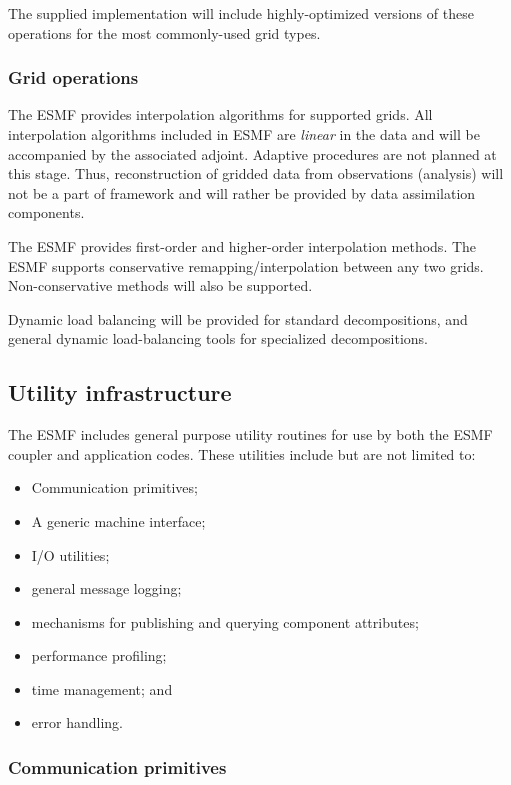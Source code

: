 The supplied implementation will include highly-optimized versions of
these operations for the most commonly-used grid types.

\subsubsection{Grid operations}

The ESMF provides interpolation algorithms for supported grids.  All
interpolation algorithms included in ESMF are {\it linear} in the data
and will be accompanied by the associated adjoint.  Adaptive
procedures are not planned at this stage. Thus, reconstruction of
gridded data from observations (analysis) will not be a part of
framework and will rather be provided by data assimilation components.

The ESMF provides first-order and higher-order interpolation 
methods.  The ESMF supports conservative remapping/interpolation 
between any two grids. Non-conservative methods will also 
be supported.

Dynamic load balancing will be provided for standard decompositions, 
and general dynamic load-balancing tools for specialized decompositions.

\subsection{Utility infrastructure}

The ESMF includes general purpose utility routines for use by both 
the ESMF coupler and application codes.  These utilities include 
but are not limited to:
\begin{itemize}
\item Communication primitives;
\item A generic machine interface;
\item I/O utilities;
\item general message logging;
\item mechanisms for publishing and querying component attributes;
\item performance profiling;
\item time management; and
\item error handling.
\end{itemize}

\subsubsection{Communication primitives}

